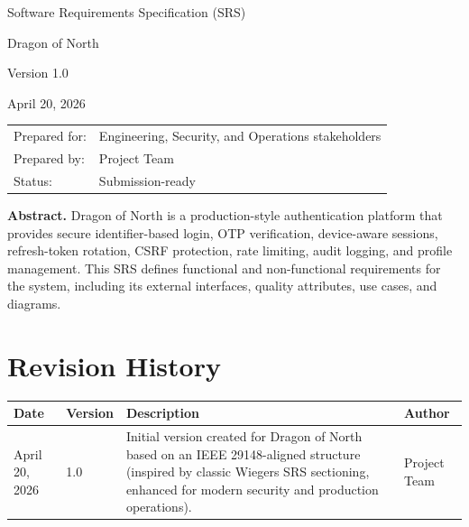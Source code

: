 \documentclass[11pt]{article}
\newcommand{\ProductName}{Dragon of North}
\newcommand{\DocTitle}{Software Requirements Specification (SRS)}
\newcommand{\DocVersion}{1.0}
\newcommand{\DocDate}{April 20, 2026}
\begin{document}

    \begin{titlepage}
        \centering
        {\LARGE \DocTitle \par}
        \vspace{0.8cm}
        {\Huge \ProductName \par}
        \vspace{0.8cm}
        {\Large Version \DocVersion \par}
        \vspace{0.4cm}
        {\large \DocDate \par}
        \vfill

        \begin{tabular}{@{}ll@{}}
            Prepared for: & Engineering, Security, and Operations stakeholders \\
            Prepared by:  & Project Team                                       \\
            Status:       & Submission-ready                                   \\
        \end{tabular}

        \vfill
        \begin{minipage}{0.9\textwidth}
            \small
            \textbf{Abstract.} \ProductName{} is a production-style authentication platform that provides secure identifier-based login, OTP verification, device-aware sessions, refresh-token rotation, CSRF protection, rate limiting, audit logging, and profile management. This SRS defines functional and non-functional requirements for the system, including its external interfaces, quality attributes, use cases, and diagrams.
        \end{minipage}
    \end{titlepage}



    \section*{Revision History}
    \begin{longtable}{@{}p{2.5cm}p{2cm}p{7.5cm}p{2.5cm}@{}}
        \toprule
        \textbf{Date} & \textbf{Version} & \textbf{Description} & \textbf{Author} \\
        \midrule
        \endhead
        \DocDate{} & \DocVersion{} & Initial version created for \ProductName{} based on an IEEE 29148-aligned structure (inspired by classic Wiegers SRS sectioning, enhanced for modern security and production operations). & Project Team \\
        \bottomrule
    \end{longtable}
\end{document}
